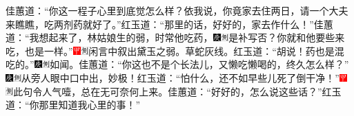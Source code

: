 佳蕙道：``你这一程子心里到底觉怎么样？依我说，你竟家去住两日，请一个大夫来瞧瞧，吃两剂药就好了。''红玉道：``那里的话，好好的，家去作什么！''佳蕙道：``我想起来了，林姑娘生的弱，时常他吃药，{\includegraphics[width=3mm]{../Images/00004}\includegraphics[width=3mm]{../Images/00011}\footnotesize \kaishu 是补写否？}你就和他要些来吃，也是一样。''{\includegraphics[width=3mm]{../Images/00002}\includegraphics[width=3mm]{../Images/00011}\footnotesize \kaishu 闲言中叙出黛玉之弱。草蛇灰线。}红玉道：``胡说！药也是混吃的。''{\includegraphics[width=3mm]{../Images/00004}\includegraphics[width=3mm]{../Images/00011}\footnotesize \kaishu 如闻。}佳蕙道：``你这也不是个长法儿，又懒吃懒喝的，终久怎么样？''{\includegraphics[width=3mm]{../Images/00004}\includegraphics[width=3mm]{../Images/00011}\footnotesize \kaishu 从旁人眼中口中出，妙极！}红玉道：``怕什么，还不如早些儿死了倒干净！''{\includegraphics[width=3mm]{../Images/00002}\includegraphics[width=3mm]{../Images/00011}\footnotesize \kaishu 此句令人气噎，总在无可奈何上来。}佳蕙道：``好好的，怎么说这些话？''红玉道：``你那里知道我心里的事！''

